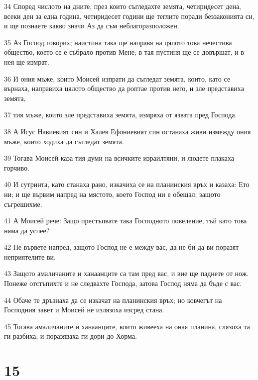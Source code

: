 \par 34 Според числото на дните, през които съгледахте земята, четиридесет дена, всеки ден за една година, четиридесет години ще теглите поради беззаконията си, и ще познаете какво значи Аз да съм неблагоразположен.
\par 35 Аз Господ говорих; наистина така ще направя на цялото това нечестива общество, което се е събрало против Мене; в тая пустиня ще се довършат, и в нея ще измрат.
\par 36 И ония мъже, които Моисей изпрати да съгледат земята, които, като се върнаха, направиха цялото общество да роптае против него, и зле представиха земята,
\par 37 тия мъже, които зле представиха земята, измряха от язвата пред Господа.
\par 38 А Исус Навиевият син и Халев Ефониевият син останаха живи измежду ония мъже, които ходиха да съгледат земята.
\par 39 Тогава Моисей каза тия думи на всичките израилтяни; и людете плакаха горчиво.
\par 40 И сутринта, като станаха рано, изкачиха се на планинския връх и казаха: Ето ни; и ще вървим напред на мястото, което Господ ни е обещал; защото съгрешихме.
\par 41 А Моисей рече: Защо престъпвате така Господното повеление, тъй като това няма да успее?
\par 42 Не вървете напред, защото Господ не е между вас, да не би да ви поразят неприятелите ви.
\par 43 Защото амаличаните и ханаанците са там пред вас, и вие ще паднете от нож. Понеже отстъпихте и не следвахте Господа, затова Господ няма да бъде с вас.
\par 44 Обаче те дръзнаха да се изкачат на планинския връх; но ковчегът на Господния завет и Моисей не излязоха изсред стана.
\par 45 Тогава амаличаните и ханаанците, които живееха на оная планина, слязоха та ги разбиха, и поразяваха ги дори до Хорма.

\chapter{15}

